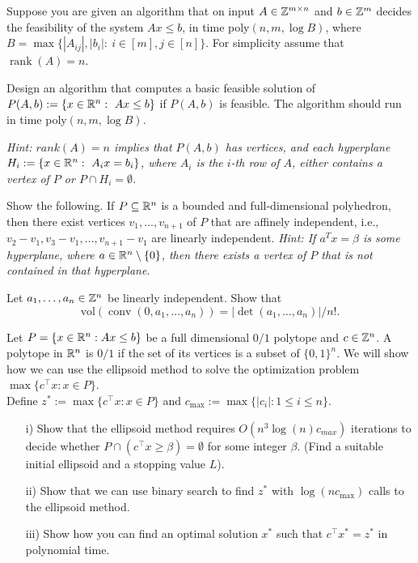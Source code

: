 \documentclass[11pt]{article}
\institute{\'Ecole Polytechnique F\'ed\'erale de Lausanne}
\newcommand{\vol}{\mathrm{vol}}
\DeclareMathOperator{\conv}{conv}
\DeclareMathOperator{\rank}{rank}
\begin{document}
\makeheader

\problem
Suppose you are given an algorithm that on input $A \in \mathbb{Z}^{m \times n}$  and $b \in \mathbb{Z}^m$ decides the feasibility of the system $Ax \leq b$, in time poly$(n,m,\log B)$, where $B = \max\{|A_{ij}|, |b_i|: \ i \in [m], j \in [n] \}$. For simplicity assume that $\rank(A)=n$. 

\smallskip

Design an algorithm that computes a basic feasible solution of $P(A,b):=\{x \in \mathbb{R}^n: \ Ax \leq b \}$ if $P(A,b)$ is feasible. The algorithm should run in time poly$(n,m,\log B)$.

\smallskip

\textit{Hint: $rank(A)=n$ implies that $P(A,b)$ has vertices, and each hyperplane $H_i := \{x \in \mathbb{R}^n: \ A_ix = b_i \}$, where $A_i$ is the $i$-th row of $A$, either contains a vertex of $P$ or $P \cap H_i = \emptyset$.}	

\problemstar
Show the following. If $P \subseteq \mathbb{R}^n$ is a bounded and full-dimensional polyhedron, then there exist vertices $v_1,\dots,v_{n+1}$ of $P$ that are affinely independent, i.e., $v_2-v_1, v_3-v_1, \dots, v_{n+1}-v_1$ are linearly independent. \emph{Hint: If $a^Tx = \beta$ is some hyperplane, where $a \in \mathbb{R}^n \setminus \{0\}$, then there exists a vertex of $P$ that is not contained in that hyperplane.}

\problem
Let $a_1,\dots,a_n \in \mathbb{Z}^n$ be linearly independent. Show that
  $$    \vol(\conv(0,a_1,\dots,a_n)) = |\det(a_1,\dots,a_n)| /n!. $$
  
\problem
Let $P = \{ x \in \mathbb{R}^{n} : Ax \leq b \}$ be a full dimensional $0/1$ polytope and $c \in \mathbb{Z}^n$. A polytope in $\mathbb{R}^n$ is $0/1$ if the set of its vertices is a subset of $\{0,1\}^n$. We will show how we can use the ellipsoid method to solve the optimization problem $\max \{  c^{\top} x : x \in P \}$. \\
	
\noindent Define $z^* := \max \{ c^{\top} x : x \in P \}$ and $c_{\max} := \max \{ |c_i| : 1 \leq i \leq n \}$. 

\begin{itemize}
\item[i)] Show that the ellipsoid method requires $O(n^3 \log (n) c_{max})$ iterations to decide whether $P \cap  (c^\top x \geq \beta) = \emptyset$ for some integer $\beta$. (Find a suitable initial ellipsoid and a stopping value  $L$).
\item[ii)] Show that we can use binary search to find $z^*$ with $\log(n c_{\max})$ calls to the ellipsoid method.
\item[iii)] Show how you can find an optimal solution $x^*$ such that $c^{\top} x^* = z^*$ in polynomial time.
\end{itemize}
\end{document}

